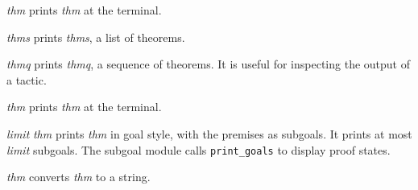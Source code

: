 \begin{ttdescription}
\item[\ttindexbold{prth} {\it thm}]  
prints {\it thm\/} at the terminal.

\item[\ttindexbold{prths} {\it thms}]  
prints {\it thms}, a list of theorems.

\item[\ttindexbold{prthq} {\it thmq}]  
prints {\it thmq}, a sequence of theorems.  It is useful for inspecting
the output of a tactic.

\item[\ttindexbold{print_thm} {\it thm}]  
prints {\it thm\/} at the terminal.

\item[\ttindexbold{print_goals} {\it limit\/} {\it thm}]  
prints {\it thm\/} in goal style, with the premises as subgoals.  It prints
at most {\it limit\/} subgoals.  The subgoal module calls {\tt print_goals}
to display proof states.

\item[\ttindexbold{string_of_thm} {\it thm}]  
converts {\it thm\/} to a string.
\end{ttdescription}


